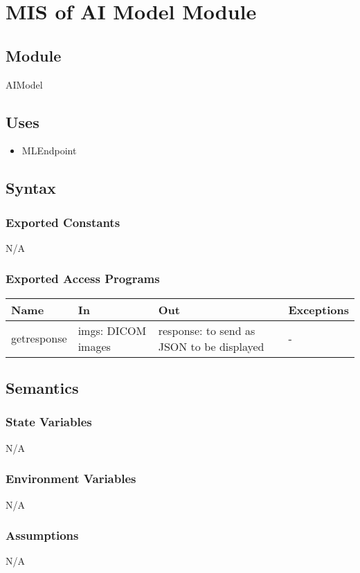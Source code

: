 \documentclass[12pt, titlepage]{article}
\begin{document}
\section{MIS of AI Model Module} \label{Module} 
\subsection{Module}
AIModel
\subsection{Uses}
\begin{itemize}
    \item MLEndpoint
\end{itemize}
\subsection{Syntax}

\subsubsection{Exported Constants}
N/A
\subsubsection{Exported Access Programs}

\begin{center}
\begin{tabular}{p{3cm} p{4cm} p{4cm} p{5cm}}
\hline
\textbf{Name} & \textbf{In} & \textbf{Out} & \textbf{Exceptions} \\
\hline
getresponse & imgs: DICOM images & response: to send as JSON to be displayed & - \\
\hline
\end{tabular}
\end{center}

\subsection{Semantics}

\subsubsection{State Variables}
N/A
\subsubsection{Environment Variables}
N/A
\subsubsection{Assumptions}
N/A
\end{document}
